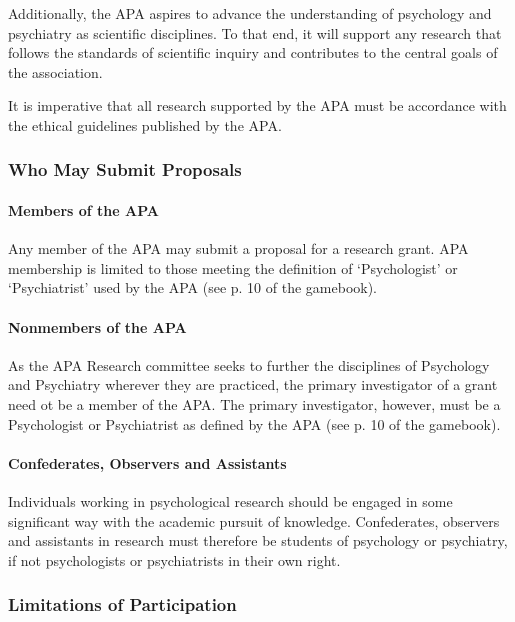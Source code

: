 Additionally, the APA aspires to advance the understanding of psychology and psychiatry as scientific disciplines. To that end, it will support any research that follows the standards of scientific inquiry and contributes to the central goals of the association.

It is imperative that all research supported by the APA must be accordance with the ethical guidelines published by the APA. 

\subsubsection{Who May Submit Proposals}
\label{whomaysubmitproposals}

\paragraph{Members of the APA}
\label{membersoftheapa}

Any member of the APA may submit a proposal for a research grant. APA membership is limited to those meeting the definition of `Psychologist' or `Psychiatrist' used by the APA (see p. 10 of the gamebook).

\paragraph{Nonmembers of the APA}
\label{nonmembersoftheapa}

As the APA Research committee seeks to further the disciplines of Psychology and Psychiatry wherever they are practiced, the primary investigator of a grant need ot be a member of the APA. The primary investigator, however, must be a Psychologist or Psychiatrist as defined by the APA (see p. 10 of the gamebook).

\paragraph{Confederates, Observers and Assistants}
\label{confederatesobserversandassistants}

Individuals working in psychological research should be engaged in some significant way with the academic pursuit of knowledge. Confederates, observers and assistants in research must therefore be students of psychology or psychiatry, if not psychologists or psychiatrists in their own right.

\subsubsection{Limitations of Participation}
\label{limitationsofparticipation}

